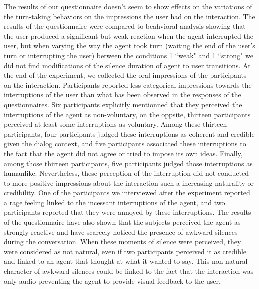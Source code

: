 The results of our questionnaire doesn't seem to show effects on the variations of the turn-taking behaviors on the impressions the user had on the interaction. The results of the questionnaire were compared to beahvioral analysis showing that the user produced a significant but weak reaction when the agent interrupted the user, but when varying the way the agent took turn (waiting the end of the user's turn or interrupting the user) between the conditions 1 ``weak" and 1 ``strong" we did not find modifications of the silence duration of agent to user transitions. At the end of the experiment, we collected the oral impressions of the participants on the interaction. Participants reported less categorical impressions towards the interruptions of the user than what has been observed in the responses of the questionnaires. Six participants explicitly mentionned that they perceived the interruptions of the agent as non-voluntary, on the oppsite, thirteen participants perceived at least some interruptions as voluntary. Among these thirteen participants, four participants judged these interruptions as coherent and credible given the dialog context, and five participants associated these interruptions to the fact that the agent did not agree or tried to impose its own ideas. Finally, among those thirteen participants, five participants judged those interruptions as humanlike. Nevertheless, these perception of the interruption did not conducted to more positive impressions about the interaction such a increasing naturality or credibility. One of the participants we interviewed after the experiment reported a rage feeling linked to the incessant interruptions of the agent, and two participants reported that they were annoyed by these interruptions. The results of the questionnaire have also shown that the subjects perceived the agent as strongly reactive and have scarcely noticed the presence of awkward silences during the conversation. When these moments of silence were perceived, they were considered as not natural, even if two participants perceived it as credible and linked to an agent that thought at what it wanted to say. This non natural character of awkward silences could be linked to the fact that the interaction was only audio preventing the agent to provide visual feedback to the user. 

